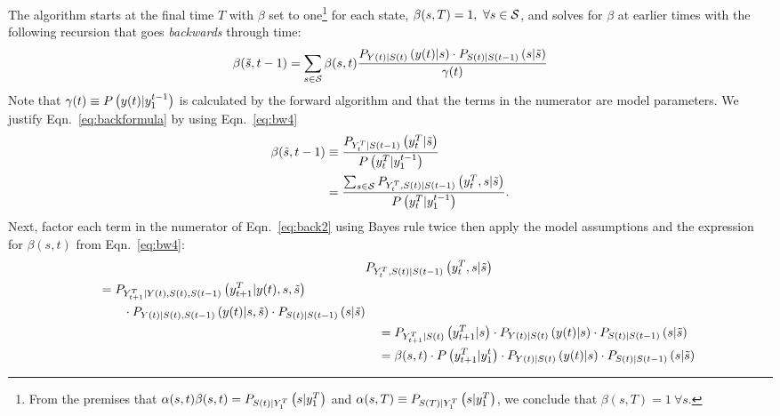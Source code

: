 The algorithm starts at the final time $T$ with $\beta$ set to
one\footnote{From the premises that $\alpha(s,t) \beta(s,t) =
  P_{{S}{(t)}|Y_{1}^{T}} \left(s|y_{1}^{T} \right)$ and
  $\alpha(s,T) \equiv P_{S(T)|Y_{1}^{T}}\left(s |y_{1}^{T}
  \right)$, we conclude that $\beta(s,T) = 1 ~\forall s$.} %
for each state, $\beta(s,T) = 1,~\forall s \in \states$, and solves
for $\beta$ at earlier times with the following recursion that goes
\emph{backwards} through time:
\begin{equation}
  \label{eq:backformula}
  \beta({\tilde s},t-1) = \sum_{s\in\states} \beta(s,t)
  \frac{ P_{\ti{Y}{t}|\ti{S}{t}}
    \left(\ti{y}{t}|s \right) \cdot P_{\ti{S}{t}|\ti{S}{t-1}}
    \left(s|{\tilde s} \right)} {\ti{\gamma}{t}}
\end{equation}
Note that ${{\gamma}{(t)} \equiv P \left( {y}{(t)} |
    y_{1}^{t-1}\right)}$ is calculated by the forward algorithm and
that the terms in the numerator are model parameters.  We justify
Eqn.~\eqref{eq:backformula} by using Eqn.~\eqref{eq:bw4}
\begin{align}
  \beta({\tilde s},t-1) & \equiv \frac{P_{\ts{Y}{t}{T}|\ti{S}{t-1}}
    \left(\ts{y}{t}{T}|{\tilde s} \right)}
  {P \left(\ts{y}{t}{T}|\ts{y}{1}{t-1} \right)} \\
  \mlabel{eq:back2}
  &= \frac{\sum_{s\in\states} P_{\ts{Y}{t}{T},\ti{S}{t}|\ti{S}{t-1}}
    \left(\ts{y}{t}{T},s|{\tilde s} \right)} {P
    \left(\ts{y}{t}{T}|\ts{y}{1}{t-1} \right)}.
\end{align}
Next, factor each term in the numerator of Eqn.~\eqref{eq:back2} using
Bayes rule twice then apply the model assumptions and the expression
for $\beta(s,t)$ from Eqn.~\eqref{eq:bw4}:
\begin{align*}
  & P_{Y_{t}^{T},{S}{(t)}|{S}{(t-1)}}\left( y_{t}^{T},s|{\tilde s} \right)\\
  \begin{split}
    &\quad= P_{Y_{t+1}^{T}|{Y}{(t)},{S}{(t)},{S}{(t-1)}}
       \left(y_{t+1}^{T}|{y}{(t)},s,{\tilde s} \right)\\
    &\quad\qquad \cdot P_{{Y}{(t)}|{S}{(t)},{S}{(t-1)}} \left({y}{(t)}|s,{\tilde s}
       \right)\cdot P_{{S}{(t)}|{S}{(t-1)}} \left(s|{\tilde s} \right)
  \end{split}\\
  &\quad= P_{Y_{t+1}^{T}|{S}{(t)}} \left(y_{t+1}^{T}|s\right)
           \cdot P_{{Y}{(t)}|{S}{(t)}} \left({y}{(t)}|s \right) \cdot
            P_{{S}{(t)}|{S}{(t-1)}} \left(s|{\tilde s} \right) \\
  &\quad= \beta(s,t) \cdot P \left(y_{t+1}^{T}|y_{1}^{t} \right)
           \cdot P_{{Y}{(t)}|{S}{(t)}} \left({y}{(t)}|s \right) \cdot
            P_{{S}{(t)}|{S}{(t-1)}} \left(s|{\tilde s} \right)
\end{align*}
